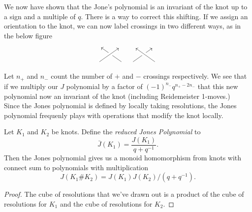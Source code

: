 We now have shown that the Jone's polynomial is an invariant of the knot up to a sign and a multiple of $q$. There is a way to correct this shifting. If we assign an orientation to the knot, we can now label crossings in two different ways, as in the below figure
\[
\begin{tikzcd}
\arrow[leftarrow]{dr}&\;\\ \arrow[crossing over]{ru} & \; \
\end{tikzcd}
\begin{tikzcd}
\;&\;\\ \arrow{ur}&\arrow[crossing over]{lu}
\end{tikzcd}
\]
Let $n_+$ and $n_-$ count the number of $+$ and $-$ crossings respectively. We see that if we multiply our $J$ polynomial by a factor of $(-1)^{n_-}q^{n_+ -2 n_-}$ that this new polynomial now an invariant of the knot (including Reidemeister 1-moves.)\\
Since the Jones polynomial is defined by locally taking resolutions, the Jones polynomial frequenly plays with operations that modify the knot locally. 
\begin{claim}
Let $K_1$ and $K_2$ be knots. Define the \emph{reduced Jones Polynomial} to \[\bar J(K_1)=\frac{J(K_1)}{q+q^{-1}}.\] Then the Jones polynomial gives us a monoid homomorphism from knots with connect sum to polynomials with multiplication \[J(K_1\# K_2)= J(K_1)J(K_2)/(q+q^{-1}).\] 
\end{claim}
\begin{proof}
The cube of resolutions that we've drawn out is a product of the cube of resolutions for $K_1$ and the cube of resolutions for $K_2$. 
\end{proof}

